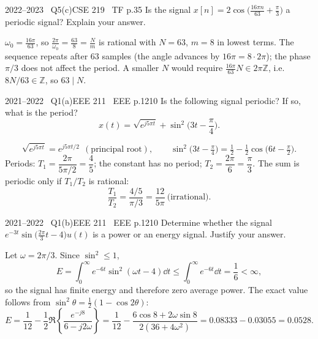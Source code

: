\begin{qcard}{2022--2023 \textbullet\ Q5(c)}{CSE 219 \textbullet\ TF p.3}{5}
Is the signal $x[n]=2\cos\!\big(\frac{16\pi n}{63}+\frac{\pi}{3}\big)$ a periodic signal? Explain your answer.
\end{qcard}
\begin{solution}
$\omega_0=\frac{16\pi}{63}$, so $\frac{2\pi}{\omega_0}=\frac{63}{8}=\frac Nm$ is rational with $N=63$, $m=8$ in lowest terms. The sequence repeats after 63 samples (the angle advances by $16\pi=8\cdot2\pi$); the phase $\pi/3$ does not affect the period. A smaller $N$ would require $\frac{16\pi}{63}N\in2\pi\mathbb Z$, i.e.\ $8N/63\in\mathbb Z$, so $63\mid N$.
\end{solution}

\begin{qcard}{2021--2022 \textbullet\ Q1(a)}{EEE 211 \textbullet\ EEE p.12}{10}
Is the following signal periodic? If so, what is the period?
\[x(t)=\sqrt{e^{j5\pi t}}+\sin^2\!\Big(3t-\frac\pi4\Big).\]
\end{qcard}
\begin{solution}
\[
\sqrt{e^{j5\pi t}}=e^{j5\pi t/2}\ \ (\text{principal root}),\qquad
\sin^2\!\Big(3t-\tfrac\pi4\Big)=\tfrac12-\tfrac12\cos\!\Big(6t-\tfrac\pi2\Big).
\]
Periods: $T_1=\dfrac{2\pi}{5\pi/2}=\dfrac45$; the constant has no period; $T_2=\dfrac{2\pi}{6}=\dfrac\pi3$. The sum is periodic only if $T_1/T_2$ is rational:
\[\frac{T_1}{T_2}=\frac{4/5}{\pi/3}=\frac{12}{5\pi}\ \text{(irrational)}.\]
\end{solution}

\begin{qcard}{2021--2022 \textbullet\ Q1(b)}{EEE 211 \textbullet\ EEE p.12}{10}
Determine whether the signal $e^{-3t}\sin\!\big(\frac{2\pi}{3}t-4\big)u(t)$ is a power or an energy signal. Justify your answer.
\end{qcard}
\begin{solution}
Let $\omega=2\pi/3$. Since $\sin^2\le1$,
\[E=\int_0^\infty e^{-6t}\sin^2(\omega t-4)\dd t\le\int_0^\infty e^{-6t}\dd t=\frac16<\infty ,\]
so the signal has finite energy and therefore zero average power. The exact value follows from $\sin^2\theta=\frac12(1-\cos2\theta)$:
\[
E=\frac1{12}-\frac12\Re\!\left\{\frac{e^{-j8}}{6-j2\omega}\right\}
=\frac1{12}-\frac{6\cos8+2\omega\sin8}{2(36+4\omega^2)}=0.08333-0.03055=0.0528 .
\]
\end{solution}

